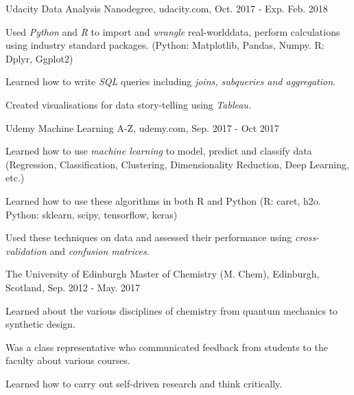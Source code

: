


\begin{cventries}
    \cventry
      {Udacity} %
      {Data Analysis Nanodegree, } %
      {udacity.com, } %
      {Oct. 2017 - Exp. Feb. 2018} %
      {
        \begin{cvitems} %
          \item {Used \textit{Python} and \textit{R} to import and \textit{wrangle} real-worlddata, perform calculations using industry standard packages. (Python: Matplotlib, Pandas, Numpy. R: Dplyr, Ggplot2)}
          \item {Learned how to write \textit{SQL} queries including \textit{joins, subqueries and aggregation}.}
          \item {Created visualisations for data story-telling using \textit{Tableau.}}
        \end{cvitems}
      }

      \cventry
      {Udemy} %
      {Machine Learning A-Z, } %
      {udemy.com, } %
      {Sep. 2017 - Oct 2017} %
      {
        \begin{cvitems} %
          \item {Learned how to use \textit{machine learning} to model, predict and classify data (Regression, Classification, Clustering, Dimensionality Reduction, Deep Learning, etc.)}
          \item {Learned how to use these algorithms in both R and Python (R: caret, h2o. Python: sklearn, scipy, tensorflow, keras)}
          \item {Used these techniques on data and assessed their performance using \textit{cross-validation} and \textit{confusion matrices}.}
        \end{cvitems}
      }

  \cventry
    {The University of Edinburgh} %
    {Master of Chemistry (M. Chem), } %
    {Edinburgh, Scotland, } %
    {Sep. 2012 - May. 2017} %
    {
      \begin{cvitems} %
        \item{Learned about the various disciplines of chemistry from quantum mechanics to synthetic design.}
        \item{Was a class representative who communicated feedback from students to the faculty about various courses. }
        \item{Learned how to carry out self-driven research and think critically.}
      \end{cvitems}
    }


\end{cventries}
